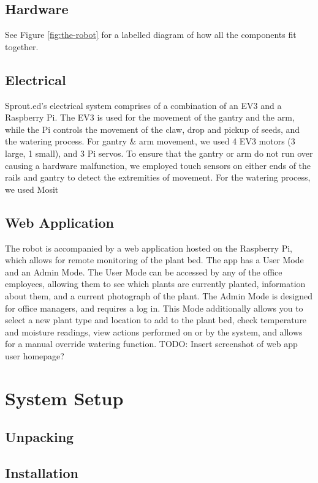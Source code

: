 \documentclass{article}
\begin{document}
\subsection{Hardware}
See Figure \ref{fig:the-robot} for a labelled diagram of how all the components fit together.

\subsection{Electrical}
Sprout.ed's electrical system comprises of a combination of an EV3 and a Raspberry Pi. The EV3 is used for the movement of the gantry and the arm, while the Pi controls the movement of the claw, drop and pickup of seeds, and the watering process. For gantry & arm movement, we used 4 EV3 motors (3 large, 1 small), and 3 Pi servos. To ensure that the gantry or arm do not run over causing a hardware malfunction, we employed touch sensors on either ends of the rails and gantry to detect the extremities of movement. For the watering process, we used Mosit 

\subsection{Web Application}
The robot is accompanied by a web application hosted on the Raspberry Pi, which allows for remote monitoring of the plant bed. The app has a User Mode and an Admin Mode. The User Mode can be accessed by any of the office employees, allowing them to see which plants are currently planted, information about them, and a current photograph of the plant. The Admin Mode is designed for office managers, and requires a log in. This Mode additionally allows you to select a new plant type and location to add to the plant bed, check temperature and moisture readings, view actions performed on or by the system, and allows for a manual override watering function.
TODO: Insert screenshot of web app user homepage?

\section{System Setup}\label{sec:setup}
\subsection{Unpacking}

\subsection{Installation}
\end{document}
